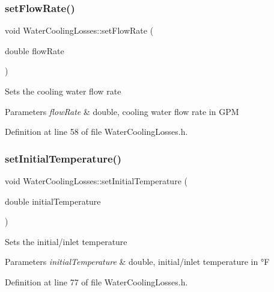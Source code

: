 \subsubsection{\texorpdfstring{set\+Flow\+Rate()}{setFlowRate()}}
{\footnotesize\ttfamily void Water\+Cooling\+Losses\+::set\+Flow\+Rate (\begin{DoxyParamCaption}\item[{double}]{flow\+Rate }\end{DoxyParamCaption})\hspace{0.3cm}{\ttfamily [inline]}}

Sets the cooling water flow rate


\begin{DoxyParams}{Parameters}
{\em flow\+Rate} & double, cooling water flow rate in G\+PM \\
\hline
\end{DoxyParams}


Definition at line 58 of file Water\+Cooling\+Losses.\+h.

\mbox{\label{class_water_cooling_losses_a56b0b64b71ecbece780622d5f4b536ba}} 
\subsubsection{\texorpdfstring{set\+Initial\+Temperature()}{setInitialTemperature()}}
{\footnotesize\ttfamily void Water\+Cooling\+Losses\+::set\+Initial\+Temperature (\begin{DoxyParamCaption}\item[{double}]{initial\+Temperature }\end{DoxyParamCaption})\hspace{0.3cm}{\ttfamily [inline]}}

Sets the initial/inlet temperature


\begin{DoxyParams}{Parameters}
{\em initial\+Temperature} & double, initial/inlet temperature in °F \\
\hline
\end{DoxyParams}


Definition at line 77 of file Water\+Cooling\+Losses.\+h.

\mbox{\label{class_water_cooling_losses_a36bb100df0580a78f63f266cdc1d41f5}} 
